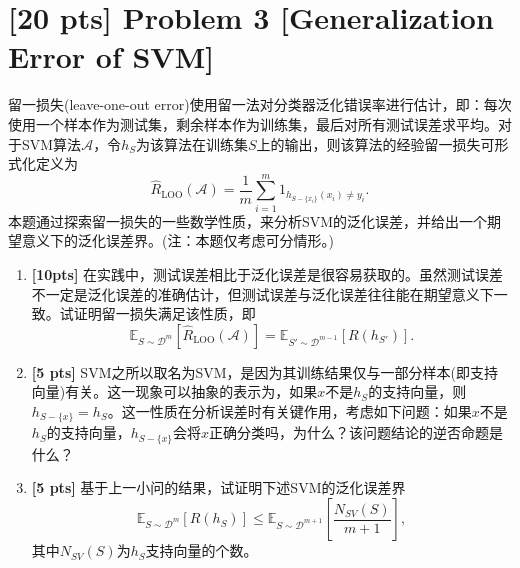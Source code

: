 \documentclass[a4paper,UTF8]{article}
\theoremstyle{definition}
\begin{document}
\section*{[20 pts] Problem 3 [Generalization Error of SVM]}

留一损失(leave-one-out error)使用留一法对分类器泛化错误率进行估计，即：每次使用一个样本作为测试集，剩余样本作为训练集，最后对所有测试误差求平均。对于SVM算法$\mathcal{A}$，令$h_S$为该算法在训练集$S$上的输出，则该算法的经验留一损失可形式化定义为
\begin{equation}
	\hat{R}_{\text{LOO}}(\mathcal{A}) = \frac{1}{m} \sum_{i=1}^m 1_{ h_{ S-\{x_i\} } (x_i) \neq y_i } . 
\end{equation}
本题通过探索留一损失的一些数学性质，来分析SVM的泛化误差，并给出一个期望意义下的泛化误差界。(注：本题仅考虑可分情形。)

\begin{enumerate}[(1)]
	\item \textbf{[10pts]} 在实践中，测试误差相比于泛化误差是很容易获取的。虽然测试误差不一定是泛化误差的准确估计，但测试误差与泛化误差往往能在期望意义下一致。试证明留一损失满足该性质，即
	\begin{equation}
		\mathbb{E}_{S \sim \mathcal{D}^m} [ \hat{R}_{\text{LOO} }(\mathcal{A}) ] = \mathbb{E}_{S' \sim \mathcal{D}^{m-1}} [ R(h_{S'}) ] . 
	\end{equation}
	\item \textbf{[5 pts]} SVM之所以取名为SVM，是因为其训练结果仅与一部分样本(即支持向量)有关。这一现象可以抽象的表示为，如果$x$不是$h_S$的支持向量，则$h_{S-\{x\}} = h_S$。这一性质在分析误差时有关键作用，考虑如下问题：如果$x$不是$h_S$的支持向量，$h_{S-\{x\}}$会将$x$正确分类吗，为什么？该问题结论的逆否命题是什么？
	\item \textbf{[5 pts]} 基于上一小问的结果，试证明下述SVM的泛化误差界
	\begin{equation}
		\mathbb{E}_{S \sim \mathcal{D}^m}[ R(h_S) ] \leq \mathbb{E}_{S \sim \mathcal{D}^{m+1}} \left[ \frac{N_{SV}(S)}{m+1} \right] , 
	\end{equation}
	其中$N_{SV}(S)$为$h_S$支持向量的个数。
\end{enumerate}
\end{document}
